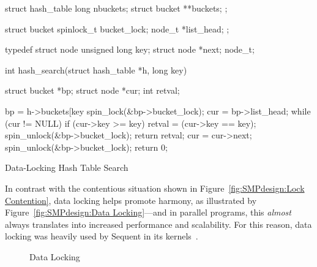 \begin{listing}[tb]
\begin{VerbatimL}
struct hash_table
{
	long nbuckets;
	struct bucket **buckets;
};

struct bucket {
	spinlock_t bucket_lock;
	node_t *list_head;
};

typedef struct node {
	unsigned long key;
	struct node *next;
} node_t;

int hash_search(struct hash_table *h, long key)
{
	struct bucket *bp;
	struct node *cur;
	int retval;

	bp = h->buckets[key %
	spin_lock(&bp->bucket_lock);
	cur = bp->list_head;
	while (cur != NULL) {
		if (cur->key >= key) {
			retval = (cur->key == key);
			spin_unlock(&bp->bucket_lock);
			return retval;
		}
		cur = cur->next;
	}
	spin_unlock(&bp->bucket_lock);
	return 0;
}
\end{VerbatimL}
\caption{Data-Locking Hash Table Search}
\label{lst:SMPdesign:Data-Locking Hash Table Search}
\end{listing}

In contrast with the contentious situation
shown in Figure~\ref{fig:SMPdesign:Lock Contention},
data locking helps promote harmony, as illustrated by
Figure~\ref{fig:SMPdesign:Data Locking}---and in parallel programs,
this \emph{almost} always translates into increased performance and
scalability.
For this reason, data locking was heavily used by Sequent in its
kernels~\cite{Beck85,Inman85,Garg90,Dove90,McKenney92b,McKenney92a,McKenney93}.

\begin{figure}[tbh]
\centering
{}
\caption{Data Locking}
\end{figure}



